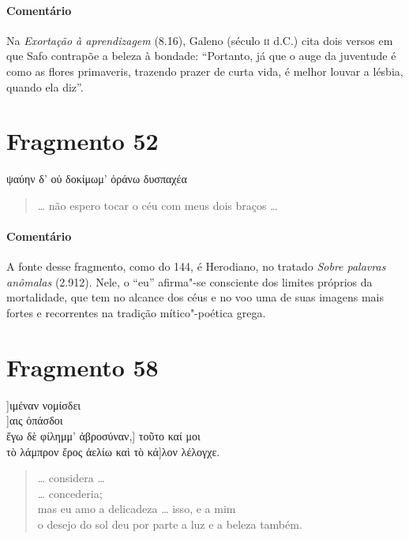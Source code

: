 {{\paragraph{Comentário} Na \textit{Exortação à aprendizagem} (8.16), Galeno (século \textsc{ii} d.C.) cita dois versos
em que Safo contrapõe a beleza à bondade: ``Portanto, já que o auge da
juventude é como as flores primaveris, trazendo prazer de curta vida, é melhor
louvar a lésbia, quando ela diz''.}

\pagebreak
\section{Fragmento 52}

\begin{gkverse}
ψαύην δ’ οὐ δοκίμωμ’ ὀράνω \dagger{}δυσπαχέα\dagger{}
\end{gkverse}

\begin{verse}
\ldots{} não espero tocar o céu com meus dois braços \ldots{}
\end{verse}

{\paragraph{Comentário} A fonte desse fragmento, como do 144, é Herodiano, no tratado \textit{Sobre
palavras anômalas} (2.912). Nele, o “eu” afirma"-se consciente dos limites próprios da
mortalidade, que tem no alcance dos céus e no voo uma de suas imagens mais
fortes e recorrentes na tradição mítico"-poética grega.}


\section{Fragmento 58}

\begin{gkverse}
]ιμέναν νομίσδει\\
    ]αις ὀπάσδοι\\
ἔγω δὲ φίλημμ’ ἀβροσύναν,\qquad       ] τοῦτο καί μοι\\
τὸ λάμπρον ἔρος ἀελίω καὶ τὸ κά]λον λέλογχε.
\end{gkverse}

\begin{verse}
\ldots{} considera \ldots{}\\
\ldots{} concederia;\\
mas eu amo a delicadeza \ldots{} isso, e a mim\\
o desejo do sol deu por parte a luz e a beleza também.
\end{verse}

}

